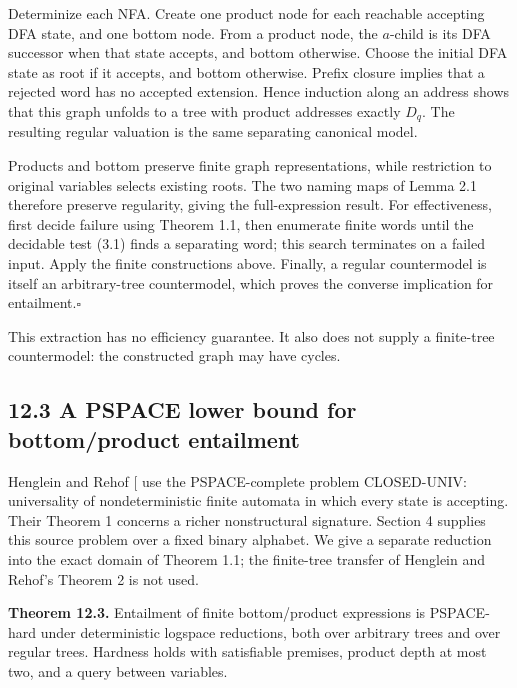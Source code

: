 \documentclass[
  11pt,
  a4paper,
]{article}
\begin{document}
Determinize each NFA. Create one product node for each reachable
accepting DFA state, and one bottom node. From a product node, the
\(a\)-child is its DFA successor when that state accepts, and bottom
otherwise. Choose the initial DFA state as root if it accepts, and
bottom otherwise. Prefix closure implies that a rejected word has no
accepted extension. Hence induction along an address shows that this
graph unfolds to a tree with product addresses exactly \(D_q\). The
resulting regular valuation is the same separating canonical model.

Products and bottom preserve finite graph representations, while
restriction to original variables selects existing roots. The two naming
maps of Lemma 2.1 therefore preserve regularity, giving the
full-expression result. For effectiveness, first decide failure using
Theorem 1.1, then enumerate finite words until the decidable test (3.1)
finds a separating word; this search terminates on a failed input. Apply
the finite constructions above. Finally, a regular countermodel is
itself an arbitrary-tree countermodel, which proves the converse
implication for entailment.\nobreak\hspace{.5em}\(\square\)

This extraction has no efficiency guarantee. It also does not supply a
finite-tree countermodel: the constructed graph may have cycles.

\subsection{12.3 A PSPACE lower bound for bottom/product
entailment}\label{a-pspace-lower-bound-for-bottomproduct-entailment}

Henglein and Rehof {[}\citeproc{ref-HR98}{2, sec. 4}{]} use the
PSPACE-complete problem CLOSED-UNIV: universality of nondeterministic
finite automata in which every state is accepting. Their Theorem 1
concerns a richer nonstructural signature. Section 4 supplies this
source problem over a fixed binary alphabet. We give a separate
reduction into the exact domain of Theorem 1.1; the finite-tree transfer
of Henglein and Rehof's Theorem 2 is not used.


\textbf{Theorem 12.3.} Entailment of finite bottom/product expressions
is PSPACE-hard under deterministic logspace reductions, both over
arbitrary trees and over regular trees. Hardness holds with satisfiable
premises, product depth at most two, and a query between variables.
\end{document}
